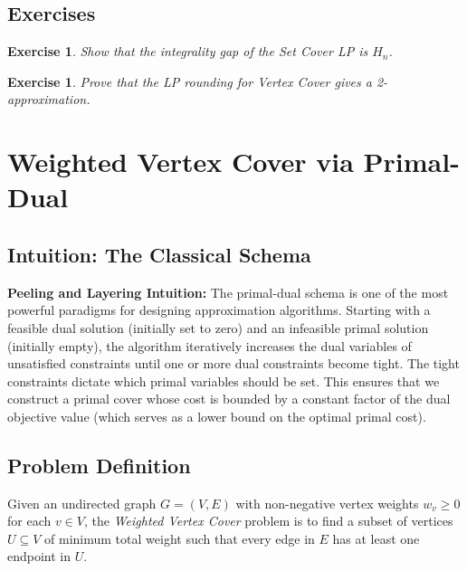 \documentclass[11pt,oneside]{book}
\newtheorem{exercise}[theorem]{Exercise}
\begin{document}
\section{Exercises}
\begin{exercise}
Show that the integrality gap of the Set Cover LP is $H_n$.
\end{exercise}
\begin{exercise}
Prove that the LP rounding for Vertex Cover gives a 2-approximation.
\end{exercise}



\setcounter{chapter}{14}
\chapter{Weighted Vertex Cover via Primal-Dual}
\label{ch:weighted_vertex_cover_pd}

\section{Intuition: The Classical Schema}

\begin{intuitionbox}
\textbf{Peeling and Layering Intuition:} The primal-dual schema is one of the most powerful paradigms for designing approximation algorithms. Starting with a feasible dual solution (initially set to zero) and an infeasible primal solution (initially empty), the algorithm iteratively increases the dual variables of unsatisfied constraints until one or more dual constraints become tight. The tight constraints dictate which primal variables should be set. This ensures that we construct a primal cover whose cost is bounded by a constant factor of the dual objective value (which serves as a lower bound on the optimal primal cost).
\end{intuitionbox}

\section{Problem Definition}
Given an undirected graph $G = (V, E)$ with non-negative vertex weights $w_v \ge 0$ for each $v \in V$, the \emph{Weighted Vertex Cover} problem is to find a subset of vertices $U \subseteq V$ of minimum total weight such that every edge in $E$ has at least one endpoint in $U$.
\end{document}
